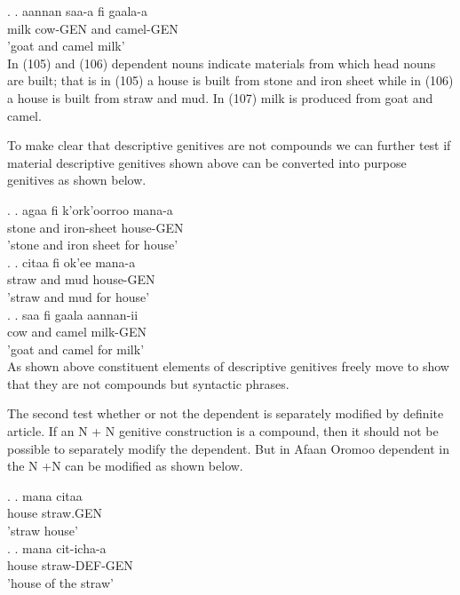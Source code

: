 \documentclass[11pt,a4paper]{article}
\begin{document}
	\ex.
	\ag.
	aannan sa\textipa{\textbarglotstop}a-a fi gaala-a\\
	milk cow-GEN and camel-GEN\\
	'goat and camel milk'\\
	
	In (105) and (106) dependent nouns indicate materials from which head nouns are built; that is in (105) a house is built from stone and iron sheet while in (106) a house is built from straw and mud. In (107) milk is produced from goat and camel. 
	
	To make clear that descriptive genitives are not compounds we can further test if material descriptive genitives shown above can be converted into purpose genitives as shown below.
	
	\ex.
	\ag.
	agaa fi k'ork'oorroo mana-a\\
	stone and iron-sheet house-GEN\\
	'stone and iron sheet for house'\\
	
	\ex.
	\ag.
	citaa fi ok'ee mana-a \\
	straw and mud house-GEN\\
	'straw and mud for house'\\
	
	\ex.
	\ag.
	sa\textipa{\textbarglotstop}a fi gaala aannan-ii\\
	cow and camel milk-GEN\\
	'goat and camel for milk'\\
	
	As shown above constituent elements of descriptive genitives freely move to show that they are not compounds but syntactic phrases. 
	
	The second test whether or not the dependent is separately modified by definite article. If an N + N genitive construction is a compound, then it should not be possible to separately modify the dependent. But in Afaan Oromoo dependent in the N +N can be modified as shown below.
	
	
	\ex.
	\ag.
	mana citaa \\
	house straw.GEN\\
	'straw house'\\
	
	\ex.
	\ag.
	mana cit-icha-a \\
	house straw-DEF-GEN\\
	'house of the straw'\\
	
\end{document}
